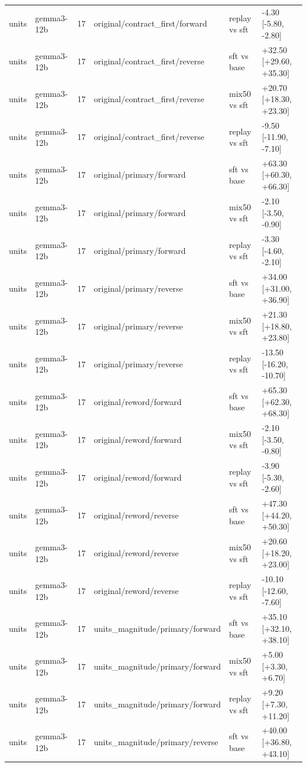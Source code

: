 \begin{table}[t]
\begin{tabular}{llllll}
units & gemma3-12b & 17 & original/contract\_first/forward & replay vs sft & -4.30 [-5.80, -2.80] \\
units & gemma3-12b & 17 & original/contract\_first/reverse & sft vs base & +32.50 [+29.60, +35.30] \\
units & gemma3-12b & 17 & original/contract\_first/reverse & mix50 vs sft & +20.70 [+18.30, +23.30] \\
units & gemma3-12b & 17 & original/contract\_first/reverse & replay vs sft & -9.50 [-11.90, -7.10] \\
units & gemma3-12b & 17 & original/primary/forward & sft vs base & +63.30 [+60.30, +66.30] \\
units & gemma3-12b & 17 & original/primary/forward & mix50 vs sft & -2.10 [-3.50, -0.90] \\
units & gemma3-12b & 17 & original/primary/forward & replay vs sft & -3.30 [-4.60, -2.10] \\
units & gemma3-12b & 17 & original/primary/reverse & sft vs base & +34.00 [+31.00, +36.90] \\
units & gemma3-12b & 17 & original/primary/reverse & mix50 vs sft & +21.30 [+18.80, +23.80] \\
units & gemma3-12b & 17 & original/primary/reverse & replay vs sft & -13.50 [-16.20, -10.70] \\
units & gemma3-12b & 17 & original/reword/forward & sft vs base & +65.30 [+62.30, +68.30] \\
units & gemma3-12b & 17 & original/reword/forward & mix50 vs sft & -2.10 [-3.50, -0.80] \\
units & gemma3-12b & 17 & original/reword/forward & replay vs sft & -3.90 [-5.30, -2.60] \\
units & gemma3-12b & 17 & original/reword/reverse & sft vs base & +47.30 [+44.20, +50.30] \\
units & gemma3-12b & 17 & original/reword/reverse & mix50 vs sft & +20.60 [+18.20, +23.00] \\
units & gemma3-12b & 17 & original/reword/reverse & replay vs sft & -10.10 [-12.60, -7.60] \\
units & gemma3-12b & 17 & units\_magnitude/primary/forward & sft vs base & +35.10 [+32.10, +38.10] \\
units & gemma3-12b & 17 & units\_magnitude/primary/forward & mix50 vs sft & +5.00 [+3.30, +6.70] \\
units & gemma3-12b & 17 & units\_magnitude/primary/forward & replay vs sft & +9.20 [+7.30, +11.20] \\
units & gemma3-12b & 17 & units\_magnitude/primary/reverse & sft vs base & +40.00 [+36.80, +43.10] \\

\end{tabular}
\end{table}
